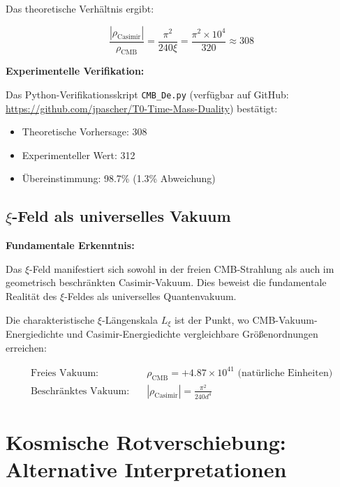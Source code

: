 \documentclass[12pt,a4paper]{article}
\newcommand{\xipar}{\xi}
\newcommand{\Lxi}{L_\xi}
\newcommand{\rhoCMB}{\rho_{\text{CMB}}}
\newcommand{\rhoCasimir}{\rho_{\text{Casimir}}}
\begin{document}
	Das theoretische Verhältnis ergibt:
	
	\begin{equation}
		\frac{|\rhoCasimir|}{\rhoCMB} = \frac{\pi^2}{240 \xipar} = \frac{\pi^2 \times 10^4}{320} \approx 308
	\end{equation}
	
	\begin{experiment}
		\textbf{Experimentelle Verifikation:}
		
		Das Python-Verifikationsskript \texttt{CMB\_De.py} (verfügbar auf GitHub: \url{https://github.com/jpascher/T0-Time-Mass-Duality}) bestätigt:
		
		\begin{itemize}
			\item Theoretische Vorhersage: 308
			\item Experimenteller Wert: 312
			\item Übereinstimmung: 98.7\% (1.3\% Abweichung)
		\end{itemize}
	\end{experiment}
	
	\subsection{$\xi$-Feld als universelles Vakuum}
	
	\begin{revolutionary}
		\textbf{Fundamentale Erkenntnis:}
		
		Das $\xi$-Feld manifestiert sich sowohl in der freien CMB-Strahlung als auch im geometrisch beschränkten Casimir-Vakuum. Dies beweist die fundamentale Realität des $\xi$-Feldes als universelles Quantenvakuum.
	\end{revolutionary}
	
	Die charakteristische $\xi$-Längenskala $\Lxi$ ist der Punkt, wo CMB-Vakuum-Energiedichte und Casimir-Energiedichte vergleichbare Größenordnungen erreichen:
	
	\begin{align}
		\text{Freies Vakuum:} \quad &\rhoCMB = +4.87 \times 10^{41} \text{ (natürliche Einheiten)} \\
		\text{Beschränktes Vakuum:} \quad &|\rhoCasimir| = \frac{\pi^2}{240 d^4}
	\end{align}
	
	\section{Kosmische Rotverschiebung: Alternative Interpretationen}
	
\end{document}
